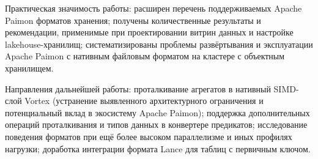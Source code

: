 Практическая значимость работы: расширен перечень поддерживаемых Apache Paimon
форматов хранения; получены количественные результаты и рекомендации, применимые при
проектировании витрин данных и настройке lakehouse-хранилищ; систематизированы
проблемы развёртывания и эксплуатации Apache Paimon с нативным файловым форматом на
кластере с объектным хранилищем.

Направления дальнейшей работы: проталкивание агрегатов в нативный SIMD-слой Vortex
(устранение выявленного архитектурного ограничения и потенциальный вклад в
экосистему Apache Paimon); поддержка дополнительных операций проталкивания и типов
данных в конвертере предикатов; исследование поведения форматов при ещё более высоком
параллелизме и иных профилях нагрузки; доработка интеграции формата Lance для
таблиц с первичным ключом.
